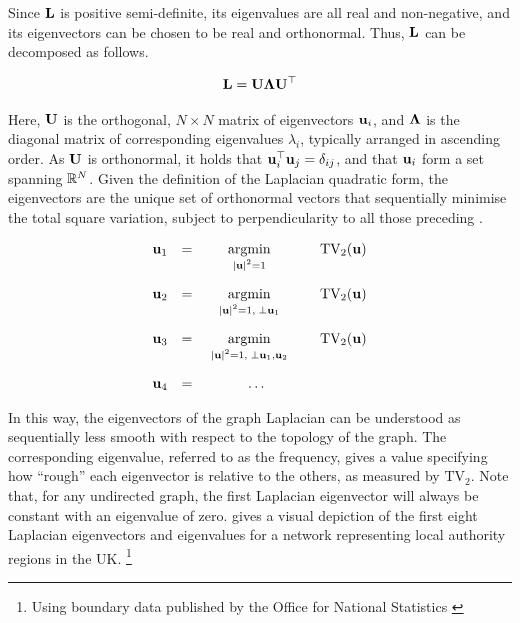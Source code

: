 Since $\mathbf{L}$ is positive semi-definite, its eigenvalues are all real and non-negative, and its eigenvectors can be chosen to be real and orthonormal. Thus, $\mathbf{L}$ can be decomposed as follows. 

\begin{equation}
    \mathbf{L} = \mathbf{U} \mathbf{\Lambda} \mathbf{U}^\top
\end{equation}

Here, $\mathbf{U}$ is the orthogonal, $N \times N$ matrix of eigenvectors ${\mathbf{u}_i}$, and $\mathbf{\Lambda}$ is the diagonal matrix of corresponding eigenvalues ${\lambda_i}$, typically arranged in ascending order. As $\mathbf{U}$ is orthonormal, it holds that $\mathbf{u}_i^\top \mathbf{u}_j = \delta_{ij}$, and that ${\mathbf{u}_i}$ form a set spanning $\mathbb{R}^N$. Given the definition of the Laplacian quadratic form, the eigenvectors are the unique set of orthonormal vectors that sequentially minimise the total square variation, subject to perpendicularity to all those preceding \citep{Spielman2019}.


$$
\begin{matrix}
    \uu_1 & = & \underset{\raisebox{-0.1cm} { $ \scriptstyle |\uu|^2 = 1$ }}{\text{argmin}} \quad & \text{TV}_2(\uu) \\[0.7cm]
    \uu_2 & = & \underset{\raisebox{-0.1cm} { $ \scriptstyle |\uu|^2 = 1, \; \perp \uu_1$ }}{\text{argmin}} \quad & \text{TV}_2(\uu) \\[0.7cm]
    \uu_3 & = & \underset{\raisebox{-0.1cm} { $ \scriptstyle |\uu|^2 = 1, \;\perp \uu_1, \uu_2$ }}{\text{argmin}} \quad & \text{TV}_2(\uu) \\[0.7cm]
    \uu_4 & = & \ldots
\end{matrix}
$$

\newpage

In this way, the eigenvectors of the graph Laplacian can be understood as sequentially less smooth with respect to the topology of the graph. The corresponding eigenvalue, referred to as the frequency, gives a value specifying how ``rough'' each eigenvector is relative to the others, as measured by $\text{TV}_2$. Note that, for any undirected graph, the first Laplacian eigenvector will always be constant with an eigenvalue of zero.  gives a visual depiction of the first eight Laplacian eigenvectors and eigenvalues for a network representing local authority regions in the UK. \footnote{Using boundary data published by the Office for National Statistics \citep{ONS2019}}  

